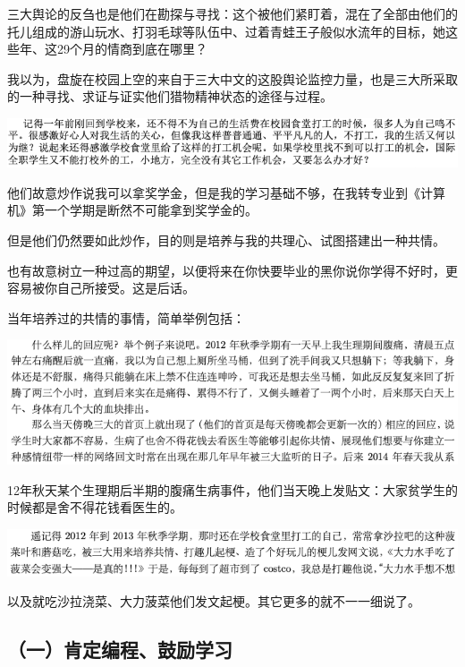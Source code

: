 \documentclass[9pt, b5paper]{article}
\begin{document}
三大舆论的反刍也是他们在勘探与寻找：这个被他们紧盯着，混在了全部由他们的托儿组成的游山玩水、打羽毛球等队伍中、过着青蛙王子般似水流年的目标，她这些年、这29个月的情商到底在哪里？

我以为，盘旋在校园上空的来自于三大中文的这股舆论监控力量，也是三大所采取的一种寻找、求证与证实他们猎物精神状态的途径与过程。

\begin{center}
\includegraphics[width=.9\linewidth]{./pic/backups_plans_20210424_220444.png}
\end{center}

他们故意炒作说我可以拿奖学金，但是我的学习基础不够，在我转专业到《计算机》第一个学期是断然不可能拿到奖学金的。

但是他们仍然要如此炒作，目的则是培养与我的共理心、试图搭建出一种共情。

也有故意树立一种过高的期望，以便将来在你快要毕业的黑你说你学得不好时，更容易被你自己所接受。这是后话。 

当年培养过的共情的事情，简单举例包括：

\begin{center}
\includegraphics[width=.9\linewidth]{./pic/backups_plans_20210501_092102.png}
\end{center}

12年秋天某个生理期后半期的腹痛生病事件，他们当天晚上发贴文：大家贫学生的时候都是舍不得花钱看医生的。 

\begin{center}
\includegraphics[width=.9\linewidth]{./pic/backups_plans_20210501_092152.png}
\end{center}

以及就吃沙拉浇菜、大力菠菜他们发文起梗。其它更多的就不一一细说了。 

\subsection{（一）肯定编程、鼓励学习}
\label{sec:org7e418bc}
\end{document}
